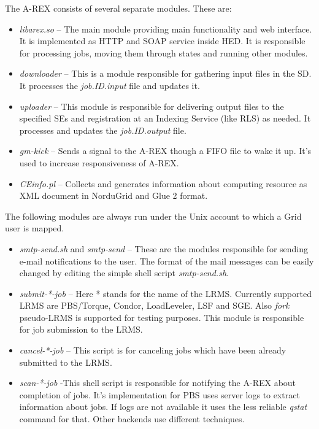 \documentclass{article}                            %
\begin{document}
The A-REX consists of several separate modules. These are:

\begin{itemize}
\item \textit{libarex.so} -- The main module providing main functionality
and web interface. It is implemented as HTTP and SOAP service inside
HED. It is responsible for processing jobs, moving them through states
and running other modules.
\item \textit{downloader} -- This is a module responsible for gathering input
files in the SD. It processes the \textit{job.ID.input} file and updates
it.
\item \textit{uploader} -- This module is responsible for delivering output
files to the specified SEs and registration at an Indexing Service
(like RLS) as needed. It processes and updates the \textit{job.ID.output}
file.
\end{itemize}



\begin{itemize}
\item \emph{gm-kick} -- Sends a signal to the A-REX though a FIFO file to
wake it up. It's used to increase responsiveness of A-REX.
\item \emph{CEinfo.pl} -- Collects and generates information about computing
resource as XML document in NorduGrid and Glue 2 format.
\end{itemize}

The following modules are always run under the Unix account to which
a Grid user is mapped.

\begin{itemize}
\item \textit{smtp-send.sh} and \textit{smtp-send} -- These are the modules
responsible for sending e-mail notifications to the user. The format
of the mail messages can be easily changed by editing the simple shell
script \textit{smtp-send.sh}. 
\item \textit{submit-{*}-job} -- Here {*} stands for the name of the LRMS.
Currently supported LRMS are PBS/Torque, Condor, LoadLeveler, LSF
and SGE. Also \emph{fork} pseudo-LRMS is supported for testing purposes.
This module is responsible for job submission to the LRMS.
\item \textit{cancel-{*}-job} -- This script is for canceling jobs which
have been already submitted to the LRMS.
\item \textit{scan-{*}-job} -This shell script is responsible for notifying
the A-REX about completion of jobs. It's implementation for PBS uses
server logs to extract information about jobs. If logs are not available
it uses the less reliable \emph{qstat} command for that. Other backends
use different techniques.
\end{itemize}
\end{document}

